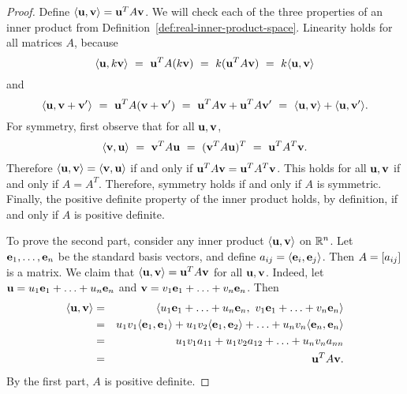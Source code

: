 \begin{proof}
  Define $\iprod{\vect{u},\vect{v}} = \vect{u}^T A \vect{v}$. We will
  check each of the three properties of an inner product from
  Definition~\ref{def:real-inner-product-space}. Linearity holds
  for all matrices $A$, because
  \begin{equation*}
    \iprod{\vect{u},k\vect{v}} 
    ~=~ \vect{u}^T A (k\vect{v}) 
    ~=~ k(\vect{u}^T A \vect{v}) 
    ~=~ k\iprod{\vect{u},\vect{v}}
  \end{equation*}
  and
  \begin{equation*}
    \iprod{\vect{u},\vect{v}+\vect{v}'} 
    ~=~ \vect{u}^T A (\vect{v}+\vect{v}') 
    ~=~ \vect{u}^T A \vect{v} + \vect{u}^T A \vect{v}' 
    ~=~ \iprod{\vect{u},\vect{v}} + \iprod{\vect{u},\vect{v}'}.
  \end{equation*}
  For symmetry, first observe that for all $\vect{u},\vect{v}$, 
  \begin{equation*}
    \iprod{\vect{v},\vect{u}}
    ~=~ \vect{v}^T A \vect{u}
    ~=~ (\vect{v}^T A \vect{u})^T
    ~=~ \vect{u}^T A^T \vect{v}.
  \end{equation*}
  Therefore $\iprod{\vect{u},\vect{v}}=\iprod{\vect{v},\vect{u}}$ if
  and only if $\vect{u}^T A \vect{v} = \vect{u}^T A^T \vect{v}$. This
  holds for all $\vect{u},\vect{v}$ if and only if $A=A^T$. Therefore,
  symmetry holds if and only if $A$ is symmetric.  Finally, the
  positive definite property of the inner product holds, by
  definition, if and only if $A$ is positive definite.

  To prove the second part, consider any inner product
  $\iprod{\vect{u},\vect{v}}$ on $\mathbb{R}^n$. Let
  $\vect{e}_1,\ldots,\vect{e}_n$ be the standard basis vectors, and
  define $a_{ij} = \iprod{\vect{e}_i,\vect{e}_j}$. Then
  $A=\left[a_{ij}\right]$ is a matrix. We claim that
  $\iprod{\vect{u},\vect{v}}=\vect{u}^TA\vect{v}$ for all
  $\vect{u},\vect{v}$. Indeed, let
  $\vect{u}=u_1\vect{e}_1+\ldots+u_n\vect{e}_n$ and
  $\vect{v}=v_1\vect{e}_1+\ldots+v_n\vect{e}_n$. Then
  \begin{eqnarray*}
    \iprod{\vect{u},\vect{v}}
    &=& \iprod{u_1\vect{e}_1+\ldots+u_n\vect{e}_n,~ v_1\vect{e}_1+\ldots+v_n\vect{e}_n} \\
    &=& u_1v_1\iprod{\vect{e}_1, \vect{e}_1}
    +   u_1v_2\iprod{\vect{e}_1, \vect{e}_2}
    + \ldots
    +   u_nv_n\iprod{\vect{e}_n, \vect{e}_n} \\
    &=& u_1v_1a_{11}
    +   u_1v_2a_{12}
    + \ldots
    +   u_nv_na_{nn} \\
    &=& \vect{u}^TA\vect{v}.
  \end{eqnarray*}
  By the first part, $A$ is positive definite.  
\end{proof}


